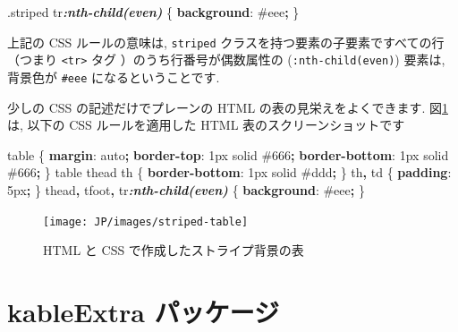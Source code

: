 \documentclass[
  11pt,
  lualatex,ja=standard,jafont=noto]{bxjsreport}
\newenvironment{Shaded}{\begin{snugshade}}{\end{snugshade}}
\newcommand{\BuiltInTok}[1]{#1}
\newcommand{\ConstantTok}[1]{\textcolor[rgb]{0.00,0.00,0.00}{#1}}
\newcommand{\DataTypeTok}[1]{\textcolor[rgb]{0.13,0.29,0.53}{#1}}
\newcommand{\DecValTok}[1]{\textcolor[rgb]{0.00,0.00,0.81}{#1}}
\newcommand{\FunctionTok}[1]{\textcolor[rgb]{0.00,0.00,0.00}{#1}}
\newcommand{\InformationTok}[1]{\textcolor[rgb]{0.56,0.35,0.01}{\textbf{\textit{#1}}}}
\newcommand{\KeywordTok}[1]{\textcolor[rgb]{0.13,0.29,0.53}{\textbf{#1}}}
\newcommand{\NormalTok}[1]{#1}
\newcommand{\OperatorTok}[1]{\textcolor[rgb]{0.81,0.36,0.00}{\textbf{#1}}}
\begin{document}
\begin{Shaded}
\begin{Highlighting}[]
\FunctionTok{.striped}\NormalTok{ tr}\InformationTok{:nth{-}child(even)}\NormalTok{ \{ }\KeywordTok{background}\NormalTok{: }\ConstantTok{\#eee}\OperatorTok{;}\NormalTok{ \}}
\end{Highlighting}
\end{Shaded}

上記の CSS ルールの意味は, \texttt{striped} クラスを持つ要素の子要素ですべての行（つまり \texttt{\textless{}tr\textgreater{}} タグ ）のうち行番号が偶数属性の (\texttt{:nth-child(even)}) 要素は, 背景色が \texttt{\#eee} になるということです.

少しの CSS の記述だけでプレーンの HTML の表の見栄えをよくできます. 図\ref{fig:striped-table}は, 以下の CSS ルールを適用した HTML 表のスクリーンショットです

\begin{Shaded}
\begin{Highlighting}[]
\NormalTok{table \{}
  \KeywordTok{margin}\NormalTok{: }\BuiltInTok{auto}\OperatorTok{;}
  \KeywordTok{border{-}top}\NormalTok{: }\DecValTok{1}\DataTypeTok{px} \DecValTok{solid} \ConstantTok{\#666}\OperatorTok{;}
  \KeywordTok{border{-}bottom}\NormalTok{: }\DecValTok{1}\DataTypeTok{px} \DecValTok{solid} \ConstantTok{\#666}\OperatorTok{;}
\NormalTok{\}}
\NormalTok{table thead th \{ }\KeywordTok{border{-}bottom}\NormalTok{: }\DecValTok{1}\DataTypeTok{px} \DecValTok{solid} \ConstantTok{\#ddd}\OperatorTok{;}\NormalTok{ \}}
\NormalTok{th}\OperatorTok{,}\NormalTok{ td \{ }\KeywordTok{padding}\NormalTok{: }\DecValTok{5}\DataTypeTok{px}\OperatorTok{;}\NormalTok{ \}}
\NormalTok{thead}\OperatorTok{,}\NormalTok{ tfoot}\OperatorTok{,}\NormalTok{ tr}\InformationTok{:nth{-}child(even)}\NormalTok{ \{ }\KeywordTok{background}\NormalTok{: }\ConstantTok{\#eee}\OperatorTok{;}\NormalTok{ \}}
\end{Highlighting}
\end{Shaded}

\begin{figure}

{\centering \texttt{[image: JP/images/striped-table]} 

}

\caption{HTML と CSS で作成したストライプ背景の表}\label{fig:striped-table}
\end{figure}

\hypertarget{kableextra}{%
\section{\texorpdfstring{\textbf{kableExtra} パッケージ}{kableExtra パッケージ}}\label{kableextra}}
\end{document}

